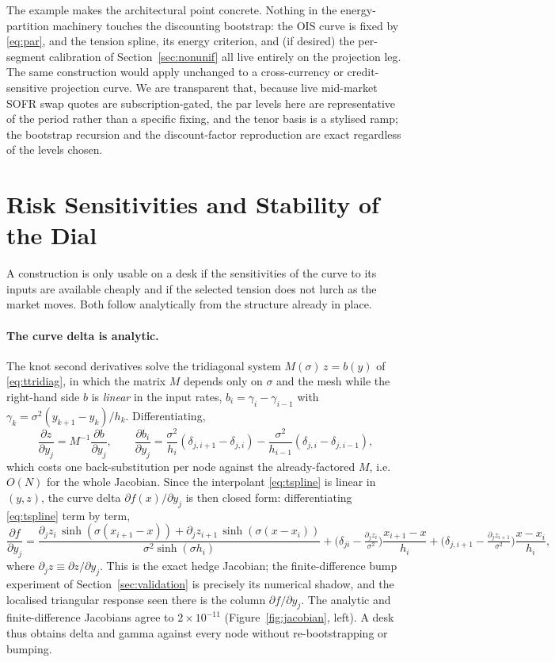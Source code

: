 \documentclass[]{interact}
\theoremstyle{plain}
\begin{document}
The example makes the architectural point concrete. Nothing in the energy-partition machinery
touches the discounting bootstrap: the OIS curve is fixed by \eqref{eq:par}, and the tension
spline, its energy criterion, and (if desired) the per-segment calibration of
Section~\ref{sec:nonunif} all live entirely on the projection leg. The same construction would
apply unchanged to a cross-currency or credit-sensitive projection curve. We are transparent
that, because live mid-market SOFR swap quotes are subscription-gated, the par levels here are
representative of the period rather than a specific fixing, and the tenor basis is a stylised
ramp; the bootstrap recursion and the discount-factor reproduction are exact regardless of the
levels chosen.

\section{Risk Sensitivities and Stability of the Dial}\label{sec:risk}
A construction is only usable on a desk if the sensitivities of the curve to its inputs are
available cheaply and if the selected tension does not lurch as the market moves. Both follow
analytically from the structure already in place.

\paragraph{The curve delta is analytic.} The knot second derivatives solve the tridiagonal
system $M(\sigma)\,z=b(y)$ of \eqref{eq:ttridiag}, in which the matrix $M$ depends only on
$\sigma$ and the mesh while the right-hand side $b$ is \emph{linear} in the input rates,
$b_i=\gamma_i-\gamma_{i-1}$ with $\gamma_k=\sigma^2(y_{k+1}-y_k)/h_k$. Differentiating,
\begin{equation}
\frac{\partial z}{\partial y_j}=M^{-1}\frac{\partial b}{\partial y_j},
\qquad
\frac{\partial b_i}{\partial y_j}=\frac{\sigma^2}{h_i}(\delta_{j,i+1}-\delta_{j,i})
-\frac{\sigma^2}{h_{i-1}}(\delta_{j,i}-\delta_{j,i-1}),
\label{eq:dzdy}
\end{equation}
which costs one back-substitution per node against the already-factored $M$, i.e.\ $O(N)$ for the
whole Jacobian. Since the interpolant \eqref{eq:tspline} is linear in $(y,z)$, the curve delta
$\partial f(x)/\partial y_j$ is then closed form: differentiating \eqref{eq:tspline} term by term,
\begin{equation}
\frac{\partial f}{\partial y_j}
=\frac{\partial_j z_i\,\sinh(\sigma(x_{i+1}-x))+\partial_j z_{i+1}\,\sinh(\sigma(x-x_i))}{\sigma^2\sinh(\sigma h_i)}
+\Big(\delta_{ji}-\tfrac{\partial_j z_i}{\sigma^2}\Big)\frac{x_{i+1}-x}{h_i}
+\Big(\delta_{j,i+1}-\tfrac{\partial_j z_{i+1}}{\sigma^2}\Big)\frac{x-x_i}{h_i},
\end{equation}
where $\partial_j z\equiv\partial z/\partial y_j$. This is the exact hedge Jacobian; the
finite-difference bump experiment of Section~\ref{sec:validation} is precisely its numerical
shadow, and the localised triangular response seen there is the column $\partial f/\partial y_j$.
The analytic and finite-difference Jacobians agree to $2\times10^{-11}$
(Figure~\ref{fig:jacobian}, left). A desk thus obtains delta and gamma against every node without
re-bootstrapping or bumping.
\end{document}
